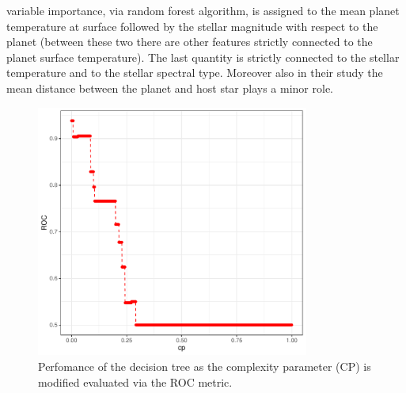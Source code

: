 \documentclass[
12pt, %
a4paper, %
oneside, %
headinclude,footinclude, %
BCOR5mm, %
]{scrartcl}
\begin{document}
variable importance, via random forest algorithm,  is assigned to the mean planet temperature at surface followed by the stellar magnitude with respect to the planet (between these two there are other features strictly connected to the planet surface temperature). The last quantity is strictly connected to the stellar temperature and to the stellar spectral type. Moreover also in their study the mean distance between the planet and host star plays a minor role.


\begin{figure}[h]
\begin{center}
\includegraphics[width=0.8\textwidth]{Pic/cp_vs_ROC.pdf}
\caption{Perfomance of the decision tree as the complexity parameter (CP) is modified evaluated via the ROC metric. }
\label{dt_cp_performance}
\end{center}
\end{figure}
\end{document}
